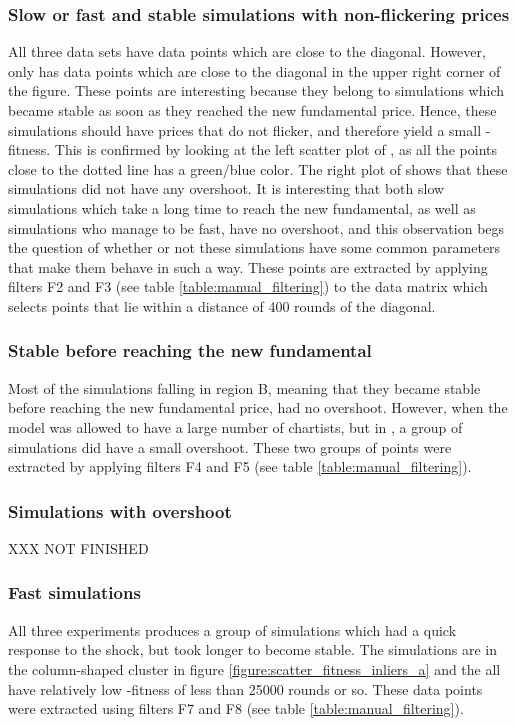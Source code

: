 \subsubsection*{Slow or fast and stable simulations with non-flickering prices}
All three data sets have data points which are close to the diagonal. However, only \dnine{} has data points which are close to the diagonal in the upper right corner of the figure. These points are interesting because they belong to simulations which became stable as soon as they reached the new fundamental price. Hence, these simulations should have prices that do not flicker, and therefore yield a small \stdev-fitness. This is confirmed by looking at the left scatter plot of \dnine, as all the points close to the dotted line has a green/blue color. The right plot of \dnine{} shows that these simulations did not have any overshoot. It is interesting that both slow simulations which take a long time to reach the new fundamental, as well as simulations who manage to be fast, have no overshoot, and this observation begs the question of whether or not these simulations have some common parameters that make them behave in such a way. These points are extracted by applying filters F2 and F3 (see table \ref{table:manual_filtering}) to the data matrix \datamatrixfit{\dnine} which selects points that lie within a distance of 400 rounds of the diagonal. 


\subsubsection*{Stable before reaching the new fundamental}
Most of the simulations falling in region B, meaning that they became stable before reaching the new fundamental price, had no overshoot. However, when the model was allowed to have a large number of chartists, but in \deleven, a group of simulations did have a small overshoot. These two groups of points were extracted by applying filters F4 and F5  (see table \ref{table:manual_filtering}).

\subsubsection*{Simulations with overshoot}
XXX NOT FINISHED

\subsubsection{Fast simulations}
All three experiments produces a group of simulations which had a quick response to the shock, but took longer to become stable. The simulations are in the column-shaped cluster in figure \ref{figure:scatter_fitness_inliers_a} and the all have relatively low \timetoreachnewfundamental-fitness of less than 25000 rounds or so. These data points were extracted using filters F7 and F8 (see table \ref{table:manual_filtering}).

